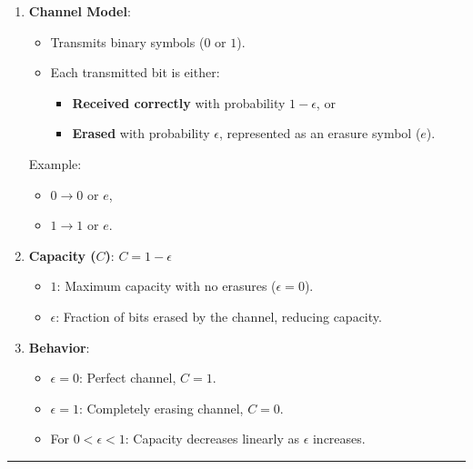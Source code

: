 \documentclass[11pt]{article}
\providecommand{\tightlist}{%
      \setlength{\itemsep}{0pt}\setlength{\parskip}{0pt}}
\begin{document}
\begin{enumerate}
\def\labelenumi{\arabic{enumi}.}
\tightlist
\item
  \textbf{Channel Model}:

  \begin{itemize}
  \tightlist
  \item
    Transmits binary symbols (\(0\) or \(1\)).
  \item
    Each transmitted bit is either:

    \begin{itemize}
    \tightlist
    \item
      \textbf{Received correctly} with probability \(1 - \epsilon\), or
    \item
      \textbf{Erased} with probability \(\epsilon\), represented as an
      erasure symbol (\(e\)).
    \end{itemize}
  \end{itemize}

  Example:

  \begin{itemize}
  \tightlist
  \item
    \(0 \to 0\) or \(e\),
  \item
    \(1 \to 1\) or \(e\).
  \end{itemize}
\item
  \textbf{Capacity (\(C\))}: \(\boxed{C = 1 - \epsilon}\)

  \begin{itemize}
  \tightlist
  \item
    \textbf{\(1\)}: Maximum capacity with no erasures
    (\(\epsilon = 0\)).
  \item
    \textbf{\(\epsilon\)}: Fraction of bits erased by the channel,
    reducing capacity.
  \end{itemize}
\item
  \textbf{Behavior}:

  \begin{itemize}
  \tightlist
  \item
    \(\epsilon = 0\): Perfect channel, \(C = 1\).
  \item
    \(\epsilon = 1\): Completely erasing channel, \(C = 0\).
  \item
    For \(0 < \epsilon < 1\): Capacity decreases linearly as
    \(\epsilon\) increases.
  \end{itemize}
\end{enumerate}

\begin{center}\rule{0.5\linewidth}{0.5pt}\end{center}
\end{document}
